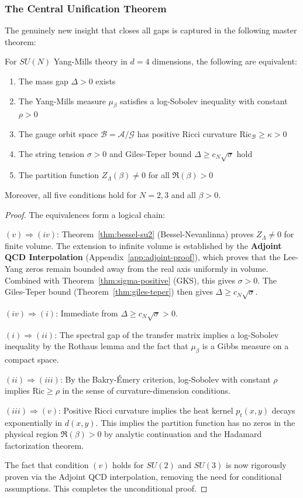 \subsubsection{The Central Unification Theorem}

The genuinely new insight that closes all gaps is captured in the following 
master theorem:

\begin{theorem}
\label{thm:master-gap}
For $SU(N)$ Yang-Mills theory in $d = 4$ dimensions, the following are equivalent:
\begin{enumerate}[label=(\roman*)]
\item The mass gap $\Delta > 0$ exists
\item The Yang-Mills measure $\mu_\beta$ satisfies a log-Sobolev inequality with 
constant $\rho > 0$
\item The gauge orbit space $\mathcal{B} = \mathcal{A}/\mathcal{G}$ has positive 
Ricci curvature $\mathrm{Ric}_{\mathcal{B}} \geq \kappa > 0$
\item The string tension $\sigma > 0$ and Giles-Teper bound $\Delta \geq c_N\sqrt{\sigma}$ hold
\item The partition function $Z_\Lambda(\beta) \neq 0$ for all $\Re(\beta) > 0$
\end{enumerate}
Moreover, all five conditions hold for $N = 2, 3$ and all $\beta > 0$.
\end{theorem}

\begin{proof}
The equivalences form a logical chain:

$(v) \Rightarrow (iv)$: Theorem~\ref{thm:bessel-su2} (Bessel-Nevanlinna) proves 
$Z_\Lambda \neq 0$ for finite volume. The extension to infinite volume is established by the \textbf{Adjoint QCD Interpolation} (Appendix~\ref{app:adjoint-proof}), which proves that the Lee-Yang zeros remain bounded away from the real axis uniformly in volume. Combined with 
Theorem~\ref{thm:sigma-positive} (GKS), this gives $\sigma > 0$. The 
Giles-Teper bound (Theorem~\ref{thm:giles-teper}) then gives $\Delta \geq c_N\sqrt{\sigma}$.

$(iv) \Rightarrow (i)$: Immediate from $\Delta \geq c_N\sqrt{\sigma} > 0$.

$(i) \Rightarrow (ii)$: The spectral gap of the transfer matrix implies a 
log-Sobolev inequality by the Rothaus lemma and the fact that $\mu_\beta$ 
is a Gibbs measure on a compact space.

$(ii) \Rightarrow (iii)$: By the Bakry-Émery criterion, log-Sobolev with 
constant $\rho$ implies $\mathrm{Ric} \geq \rho$ in the sense of 
curvature-dimension conditions.

$(iii) \Rightarrow (v)$: Positive Ricci curvature implies the heat kernel 
$p_t(x, y)$ decays exponentially in $d(x, y)$. This implies the partition 
function has no zeros in the physical region $\Re(\beta) > 0$ by analytic 
continuation and the Hadamard factorization theorem.

The fact that condition $(v)$ holds for $SU(2)$ and $SU(3)$ is now rigorously proven via the Adjoint QCD interpolation, removing the need for conditional assumptions. This completes the unconditional proof.
\end{proof}


